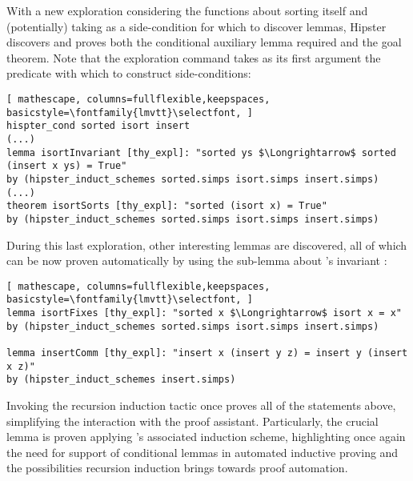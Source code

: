 With a new exploration considering the functions about sorting itself and (potentially) taking  as a side-condition for which to discover lemmas, Hipster discovers and proves both the conditional auxiliary lemma required and the goal theorem.
%
Note that the exploration command takes as its first argument the predicate with which to construct side-conditions:

\begin{lstlisting}[ mathescape, columns=fullflexible,keepspaces, basicstyle=\fontfamily{lmvtt}\selectfont, ]
hispter_cond sorted isort insert
(...)
lemma isortInvariant [thy_expl]: "sorted ys $\Longrightarrow$ sorted (insert x ys) = True"
by (hipster_induct_schemes sorted.simps isort.simps insert.simps)
(...)
theorem isortSorts [thy_expl]: "sorted (isort x) = True"
by (hipster_induct_schemes sorted.simps isort.simps insert.simps)
\end{lstlisting}

During this last exploration, other interesting lemmas are discovered, all of which can be now proven automatically by using the sub-lemma about 's invariant :

\begin{lstlisting}[ mathescape, columns=fullflexible,keepspaces, basicstyle=\fontfamily{lmvtt}\selectfont, ]
lemma isortFixes [thy_expl]: "sorted x $\Longrightarrow$ isort x = x"
by (hipster_induct_schemes sorted.simps isort.simps insert.simps)

lemma insertComm [thy_expl]: "insert x (insert y z) = insert y (insert x z)"
by (hipster_induct_schemes insert.simps)
\end{lstlisting}

Invoking the recursion induction tactic  once proves all of the statements above, simplifying the interaction with the proof assistant.
%
Particularly, the crucial lemma  is proven applying 's associated induction scheme, highlighting once again the need for support of conditional lemmas in automated inductive proving and the possibilities recursion induction brings towards proof automation.



